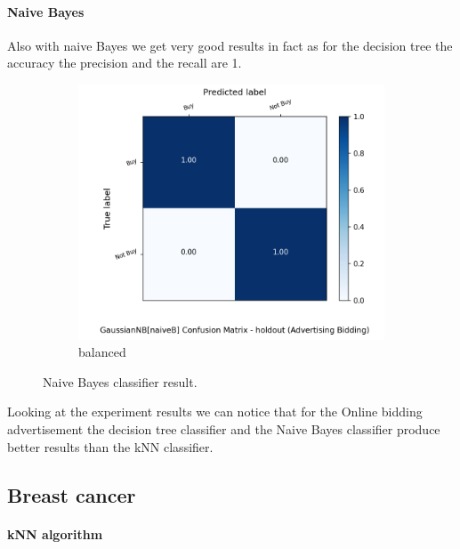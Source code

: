 \documentclass{article}
\begin{document}
\paragraph{Naive Bayes}
Also with naive Bayes we get very good results in fact as for the decision tree the accuracy the precision and the recall are 1.


\begin{figure}[H]
	\centering
	\begin{subfigure}{.5\textwidth}
		\centering
		\includegraphics[width=1.1\textwidth]{Plots/advertisingBidding_GaussianNB_naiveB_balance_True_holdout.png}
		\caption{balanced}
	\end{subfigure}%
	\caption{Naive Bayes classifier result.}
\end{figure}


\noindent Looking at the experiment results we can notice that for the Online bidding advertisement the decision tree classifier and the Naive Bayes classifier produce better results than the kNN classifier.





\subsection{Breast cancer}


\paragraph{kNN algorithm }
\end{document}
